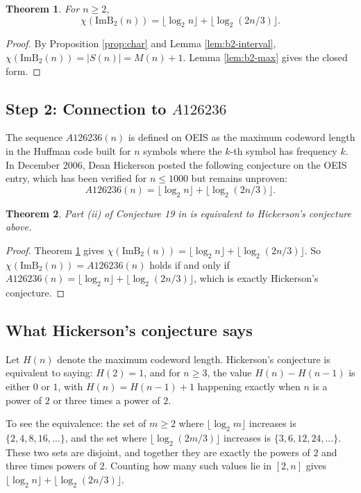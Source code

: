 \documentclass[11pt]{article}
\newtheorem{theorem}{Theorem}
\theoremstyle{remark}
\begin{document}
\begin{theorem}\label{thm:image-closed}
For $n \geq 2$,
\[
\chi(\mathrm{ImB}_2(n)) = \lfloor \log_2 n \rfloor + \lfloor \log_2(2n/3) \rfloor.
\]
\end{theorem}

\begin{proof}
By Proposition \ref{prop:char} and Lemma \ref{lem:b2-interval}, $\chi(\mathrm{ImB}_2(n)) = |S(n)| = M(n) + 1$. Lemma \ref{lem:b2-max} gives the closed form.
\end{proof}

\subsection*{Step 2: Connection to $A126236$}

The sequence $A126236(n)$ is defined on OEIS as the maximum codeword length in the Huffman code built for $n$ symbols where the $k$-th symbol has frequency $k$. In December 2006, Dean Hickerson posted the following conjecture on the OEIS entry, which has been verified for $n \leq 1000$ but remains unproven:
\[
A126236(n) = \lfloor \log_2 n \rfloor + \lfloor \log_2(2n/3) \rfloor.
\]

\begin{theorem}\label{thm:ii-equiv}
Part (ii) of Conjecture 19 in \cite{BBMS} is equivalent to Hickerson's conjecture above.
\end{theorem}

\begin{proof}
Theorem \ref{thm:image-closed} gives $\chi(\mathrm{ImB}_2(n)) = \lfloor \log_2 n \rfloor + \lfloor \log_2(2n/3) \rfloor$. So $\chi(\mathrm{ImB}_2(n)) = A126236(n)$ holds if and only if $A126236(n) = \lfloor \log_2 n \rfloor + \lfloor \log_2(2n/3) \rfloor$, which is exactly Hickerson's conjecture.
\end{proof}

\subsection*{What Hickerson's conjecture says}

Let $H(n)$ denote the maximum codeword length. Hickerson's conjecture is equivalent to saying: $H(2) = 1$, and for $n \geq 3$, the value $H(n) - H(n-1)$ is either $0$ or $1$, with $H(n) = H(n-1) + 1$ happening exactly when $n$ is a power of $2$ or three times a power of $2$.

To see the equivalence: the set of $m \geq 2$ where $\lfloor \log_2 m \rfloor$ increases is $\{2, 4, 8, 16, \dots\}$, and the set where $\lfloor \log_2(2m/3) \rfloor$ increases is $\{3, 6, 12, 24, \dots\}$. These two sets are disjoint, and together they are exactly the powers of $2$ and three times powers of $2$. Counting how many such values lie in $[2, n]$ gives $\lfloor \log_2 n \rfloor + \lfloor \log_2(2n/3) \rfloor$.
\end{document}
